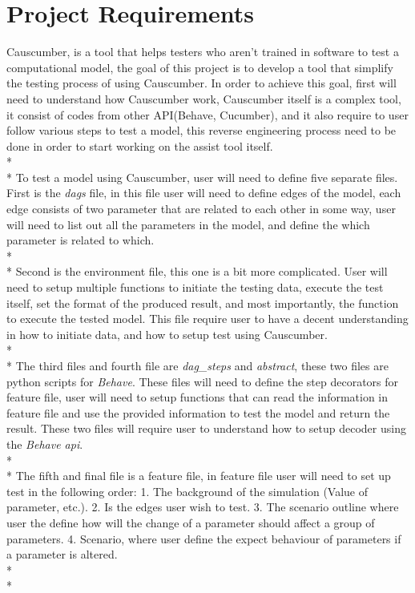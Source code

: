 \section{Project Requirements}
Causcumber, is a tool that helps testers who aren’t trained in software to test a computational model, the goal of this project is to develop a tool that simplify the testing process of using Causcumber. In order to achieve this goal, first will need to understand how Causcumber work, Causcumber itself is a complex tool, it consist of codes from other API(Behave, Cucumber), and it also require to user follow various steps to test a model, this reverse engineering process need to be done in order to start working on the assist tool itself.\\*\\*
To test a model using Causcumber, user will need to define five separate files. First is the \textsl{dags} file, in this file user will need to define edges of the model, each edge consists of two parameter that are related to each other in some way, user will need to list out all the parameters in the model, and define the which parameter is related to which.\\*\\*
Second is the environment file, this one is a bit more complicated. User will need to setup multiple functions to initiate the testing data, execute the test itself, set the format of the produced result, and most importantly, the function to execute the tested model. This file require user to have a decent understanding in how to initiate data, and how to setup test using Causcumber. \\*\\*
The third files and fourth file are \textsl{dag\_steps} and \textsl{abstract}, these two files are python scripts for \textsl{Behave}. These files will need to define the step decorators for feature file, user will need to setup functions that can read the information in feature file and use the provided information to test the model and return the result. These two files will require user to understand how to setup decoder using the \textsl{Behave api}.\\*\\*
The fifth and final file is a feature file, in feature file user will need to set up test in the following order: 1. The background of the simulation (Value of parameter, etc.). 2. Is the edges user wish to test. 3. The scenario outline where user the define how will the change of a parameter should affect a group of parameters. 4. Scenario, where user define the expect behaviour of parameters if a parameter is altered. \\*\\*
